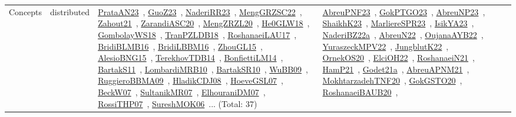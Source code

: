 {\begin{longtable}{lp{3cm}>{\raggedright\arraybackslash}p{6cm}>{\raggedright\arraybackslash}p{6cm}>{\raggedright\arraybackslash}p{8cm}}
\index{distributed}\index{Concepts!distributed}Concepts & distributed & \href{../works/PrataAN23.pdf}{PrataAN23}~\cite{PrataAN23}, \href{../works/GuoZ23.pdf}{GuoZ23}~\cite{GuoZ23}, \href{../works/NaderiRR23.pdf}{NaderiRR23}~\cite{NaderiRR23}, \href{../works/MengGRZSC22.pdf}{MengGRZSC22}~\cite{MengGRZSC22}, \href{../works/Zahout21.pdf}{Zahout21}~\cite{Zahout21}, \href{../works/ZarandiASC20.pdf}{ZarandiASC20}~\cite{ZarandiASC20}, \href{../works/MengZRZL20.pdf}{MengZRZL20}~\cite{MengZRZL20}, \href{../works/He0GLW18.pdf}{He0GLW18}~\cite{He0GLW18}, \href{../works/GombolayWS18.pdf}{GombolayWS18}~\cite{GombolayWS18}, \href{../works/TranPZLDB18.pdf}{TranPZLDB18}~\cite{TranPZLDB18}, \href{../works/RoshanaeiLAU17.pdf}{RoshanaeiLAU17}~\cite{RoshanaeiLAU17}, \href{../works/BridiBLMB16.pdf}{BridiBLMB16}~\cite{BridiBLMB16}, \href{../works/BridiLBBM16.pdf}{BridiLBBM16}~\cite{BridiLBBM16}, \href{../works/ZhouGL15.pdf}{ZhouGL15}~\cite{ZhouGL15}, \href{../works/AlesioBNG15.pdf}{AlesioBNG15}~\cite{AlesioBNG15}, \href{../works/TerekhovTDB14.pdf}{TerekhovTDB14}~\cite{TerekhovTDB14}, \href{../works/BonfiettiLM14.pdf}{BonfiettiLM14}~\cite{BonfiettiLM14}, \href{../works/BartakS11.pdf}{BartakS11}~\cite{BartakS11}, \href{../works/LombardiMRB10.pdf}{LombardiMRB10}~\cite{LombardiMRB10}, \href{../works/BartakSR10.pdf}{BartakSR10}~\cite{BartakSR10}, \href{../works/WuBB09.pdf}{WuBB09}~\cite{WuBB09}, \href{../works/RuggieroBBMA09.pdf}{RuggieroBBMA09}~\cite{RuggieroBBMA09}, \href{../works/HladikCDJ08.pdf}{HladikCDJ08}~\cite{HladikCDJ08}, \href{../works/HoeveGSL07.pdf}{HoeveGSL07}~\cite{HoeveGSL07}, \href{../works/BeckW07.pdf}{BeckW07}~\cite{BeckW07}, \href{../works/SultanikMR07.pdf}{SultanikMR07}~\cite{SultanikMR07}, \href{../works/ElhouraniDM07.pdf}{ElhouraniDM07}~\cite{ElhouraniDM07}, \href{../works/RossiTHP07.pdf}{RossiTHP07}~\cite{RossiTHP07}, \href{../works/SureshMOK06.pdf}{SureshMOK06}~\cite{SureshMOK06}... (Total: 37) & \href{../works/AbreuPNF23.pdf}{AbreuPNF23}~\cite{AbreuPNF23}, \href{../works/GokPTGO23.pdf}{GokPTGO23}~\cite{GokPTGO23}, \href{../works/AbreuNP23.pdf}{AbreuNP23}~\cite{AbreuNP23}, \href{../works/ShaikhK23.pdf}{ShaikhK23}~\cite{ShaikhK23}, \href{../works/MarliereSPR23.pdf}{MarliereSPR23}~\cite{MarliereSPR23}, \href{../works/IsikYA23.pdf}{IsikYA23}~\cite{IsikYA23}, \href{../works/NaderiBZ22a.pdf}{NaderiBZ22a}~\cite{NaderiBZ22a}, \href{../works/AbreuN22.pdf}{AbreuN22}~\cite{AbreuN22}, \href{../works/OujanaAYB22.pdf}{OujanaAYB22}~\cite{OujanaAYB22}, \href{../works/YuraszeckMPV22.pdf}{YuraszeckMPV22}~\cite{YuraszeckMPV22}, \href{../works/JungblutK22.pdf}{JungblutK22}~\cite{JungblutK22}, \href{../works/OrnekOS20.pdf}{OrnekOS20}~\cite{OrnekOS20}, \href{../works/ElciOH22.pdf}{ElciOH22}~\cite{ElciOH22}, \href{../works/RoshanaeiN21.pdf}{RoshanaeiN21}~\cite{RoshanaeiN21}, \href{../works/HamP21.pdf}{HamP21}~\cite{HamP21}, \href{../works/Godet21a.pdf}{Godet21a}~\cite{Godet21a}, \href{../works/AbreuAPNM21.pdf}{AbreuAPNM21}~\cite{AbreuAPNM21}, \href{../works/MokhtarzadehTNF20.pdf}{MokhtarzadehTNF20}~\cite{MokhtarzadehTNF20}, \href{../works/GokGSTO20.pdf}{GokGSTO20}~\cite{GokGSTO20}, \href{../works/RoshanaeiBAUB20.pdf}{RoshanaeiBAUB20}~\cite{RoshanaeiBAUB20}, 
\end{longtable}}
